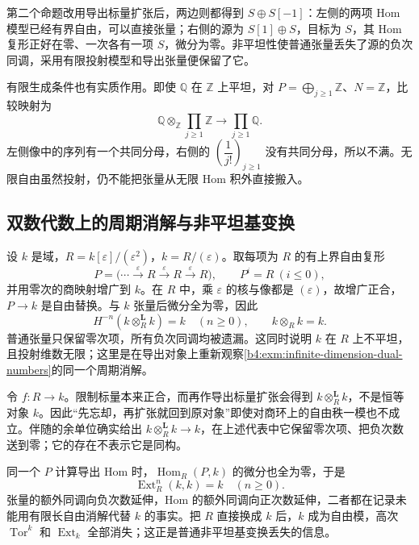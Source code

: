 \ProseParagraphBreak
第二个命题改用导出标量扩张后，两边则都得到 \(S\oplus S[-1]\)：左侧的两项 Hom 模型已经有界自由，可以直接张量；右侧的源为 \(S[1]\oplus S\)，目标为 \(S\)，其 Hom 复形正好在零、一次各有一项 \(S\)，微分为零。非平坦性使普通张量丢失了源的负次同调，采用有限投射模型和导出张量便保留了它。

\ProseParagraphBreak
有限生成条件也有实质作用。即使 \(\mathbb Q\) 在 \(\mathbb Z\) 上平坦，对 \(P=\bigoplus_{j\ge1}\mathbb Z\)、\(N=\mathbb Z\)，比较映射为
\[
	\mathbb Q\otimes_{\mathbb Z}\prod_{j\ge1}\mathbb Z \longrightarrow\prod_{j\ge1}\mathbb Q.
\]
左侧像中的序列有一个共同分母，右侧的 \(\left(\dfrac{1}{j!}\right)_{j\ge1}\) 没有共同分母，所以不满。无限自由虽然投射，仍不能把张量从无限 Hom 积外直接搬入。

\subsection{双数代数上的周期消解与非平坦基变换}
\label{b4:subsec:1803:04}

\begin{example}\label{b4:exm:dual-numbers-derived-base-change}
	设 \(k\) 是域，\(R=k[\varepsilon]/(\varepsilon^2)\)，\(k=R/(\varepsilon)\)。取每项为 \(R\) 的有上界自由复形
	\[
		P=\bigl(\cdots\xrightarrow{\varepsilon}R \xrightarrow{\varepsilon}R\xrightarrow{\varepsilon}R\bigr), \qquad P^i=R\ (i\le0),
	\]
	并用零次的商映射增广到 \(k\)。在 \(R\) 中，乘 \(\varepsilon\) 的核与像都是 \((\varepsilon)\)，故增广正合，\(P\to k\) 是自由替换。与 \(k\) 张量后微分全为零，因此
	\[
		H^{-n}(k\otimes_R^{\mathbf L}k)=k\quad(n\ge0),\qquad k\otimes_Rk=k.
	\]
	普通张量只保留零次项，所有负次同调均被遗漏。这同时说明 \(k\) 在 \(R\) 上不平坦，且投射维数无限；这里是在导出对象上重新观察\cref{b4:exm:infinite-dimension-dual-numbers}的同一个周期消解。

	\ProseParagraphBreak
	令 \(f:R\to k\)。限制标量本来正合，而再作导出标量扩张会得到 \(k\otimes_R^{\mathbf L}k\)，不是恒等对象 \(k\)。因此“先忘却，再扩张就回到原对象”即使对商环上的自由秩一模也不成立。伴随的余单位确实给出 \(k\otimes_R^{\mathbf L}k\to k\)，在上述代表中它保留零次项、把负次数送到零；它的存在不表示它是同构。

	\ProseParagraphBreak
	同一个 \(P\) 计算导出 Hom 时，\(\operatorname{Hom}_R(P,k)\) 的微分也全为零，于是
	\[
		\operatorname{Ext}_R^n(k,k)=k\quad(n\ge0).
	\]
	张量的额外同调向负次数延伸，Hom 的额外同调向正次数延伸，二者都在记录未能用有限长自由消解代替 \(k\) 的事实。把 \(R\) 直接换成 \(k\) 后，\(k\) 成为自由模，高次 \(\operatorname{Tor}^k\) 和 \(\operatorname{Ext}_k\) 全部消失；这正是普通非平坦基变换丢失的信息。
\end{example}

